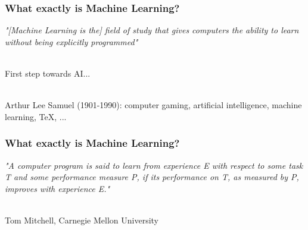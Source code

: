 \documentclass{beamer}
\begin{document}
\begin{frame}
\frametitle{What exactly is Machine Learning?}

\textit{"[Machine Learning is the] field of study that gives computers the ability to learn without being explicitly programmed"}

\ \\

First step towards AI...

\ \\

Arthur Lee Samuel (1901-1990): computer gaming, artificial intelligence, machine learning, TeX, ...

\end{frame}


\begin{frame}
\frametitle{What exactly is Machine Learning?}

\textit{"A computer program is said to learn from experience E with respect to some task T and some performance measure P, if its performance on T, as measured by P, improves with experience E."}

\ \\

Tom Mitchell, Carnegie Mellon University

\end{frame}

\end{document}
